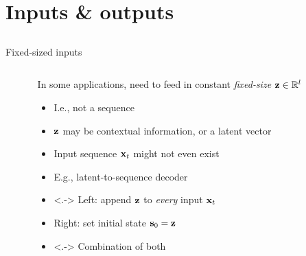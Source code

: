 \section{Inputs \& outputs}
\subsection{}

\begin{frame}{Fixed-sized inputs}
    \begin{columns}
        \begin{column}{0.15\textwidth}
        \end{column}
        \begin{column}{0.41\textwidth}
            In some \rnn{} applications, need to feed in constant \emph{fixed-size} $\mathbf{z} \in \mathbb{R}^l$
            \begin{itemize}
                \item<+-> I.e., not a sequence
                \item $\mathbf{z}$ may be contextual information, or a latent vector
                \item Input sequence $\mathbf{x}_t$ might not even exist
                \item E.g., latent-to-sequence decoder
            \end{itemize}
            \begin{itemize}
                \item<.-> Left: append $\mathbf{z}$ to \emph{every} input $\mathbf{x}_t$
                \item<+-> Right: set initial state $\mathbf{s}_0 = \mathbf{z}$
                \item<.-> Combination of both
            \end{itemize}
        \end{column}
        \begin{column}{0.44\textwidth}
            \vspace{-4mm}
        \end{column}
    \end{columns}
\end{frame}

